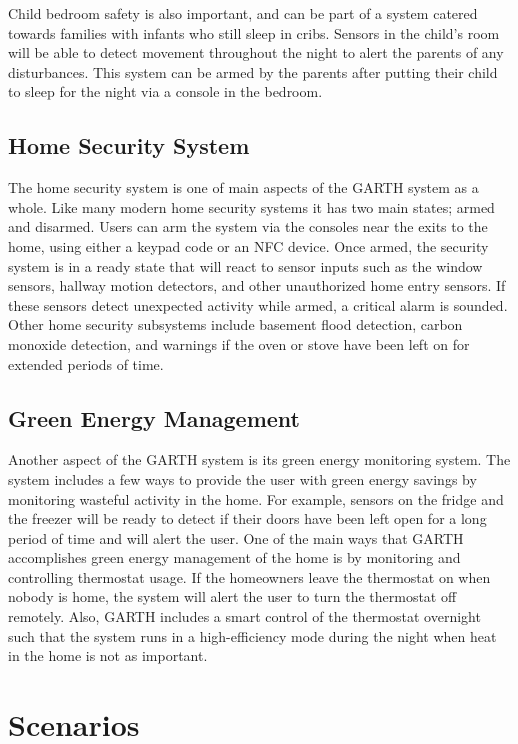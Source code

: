 \documentclass{report}
\begin{document}
Child bedroom safety is also important, and can be part of a system catered 
towards families with infants who still sleep in cribs. Sensors in the child's room 
will be able to detect movement throughout the night to alert the parents of any 
disturbances. This system can be armed by the parents after putting their child
to sleep for the night via a console in the bedroom.

\subsection{Home Security System}

The home security system is one of main aspects of the GARTH system as a
whole. Like many modern home security systems it has two main states; armed
and disarmed. Users can arm the system via the consoles near the exits to the
home, using either a keypad code or an NFC device. Once armed, the security
system is in a ready state that will react to sensor inputs such as the window
sensors, hallway motion detectors, and other unauthorized home entry sensors.
If these sensors detect unexpected activity while armed, a critical alarm is sounded.
Other home security subsystems include basement flood detection, carbon 
monoxide detection, and warnings if the oven or stove have been left on
for extended periods of time.

\subsection{Green Energy Management}

Another aspect of the GARTH system is its green energy monitoring system. The
system includes a few ways to provide the user with green energy savings by
monitoring wasteful activity in the home. For example, sensors on the fridge and 
the freezer will be ready to detect if their doors have been left open for a long period
of time and will alert the user. One of the main ways that GARTH accomplishes
green energy management of the home is by monitoring and controlling thermostat 
usage. If the homeowners leave the thermostat on when nobody is home, the
system will alert the user to turn the thermostat off remotely. Also, GARTH includes
a smart control of the thermostat overnight such that the system runs in a high-efficiency
mode during the night when heat in the home is not as important.

\section{Scenarios}
\end{document}
